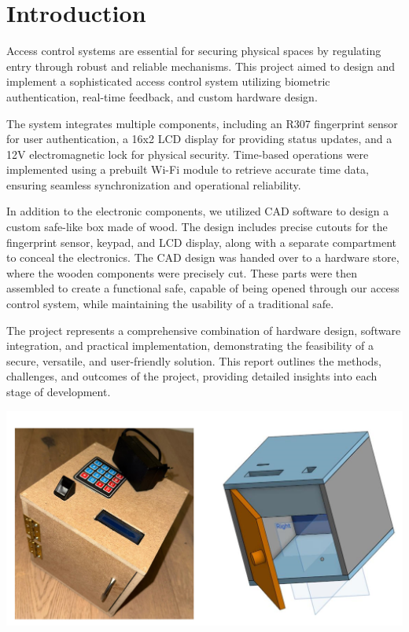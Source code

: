 \documentclass{article}
\begin{document}

\newpage 



\newpage
\section{Introduction}
Access control systems are essential for securing physical spaces by regulating entry through robust and reliable mechanisms. This project aimed to design and implement a sophisticated access control system utilizing biometric authentication, real-time feedback, and custom hardware design.

The system integrates multiple components, including an R307 fingerprint sensor for user authentication, a 16x2 LCD display for providing status updates, and a 12V electromagnetic lock for physical security. Time-based operations were implemented using a prebuilt Wi-Fi module to retrieve accurate time data, ensuring seamless synchronization and operational reliability.

In addition to the electronic components, we utilized CAD software to design a custom safe-like box made of wood. The design includes precise cutouts for the fingerprint sensor, keypad, and LCD display, along with a separate compartment to conceal the electronics. The CAD design was handed over to a hardware store, where the wooden components were precisely cut. These parts were then assembled to create a functional safe, capable of being opened through our access control system, while maintaining the usability of a traditional safe.

The project represents a comprehensive combination of hardware design, software integration, and practical implementation, demonstrating the feasibility of a secure, versatile, and user-friendly solution. This report outlines the methods, challenges, and outcomes of the project, providing detailed insights into each stage of development.



\begin{center}
    \includegraphics[width=\linewidth]{images/testpicture5.png}
    \captionsetup{hypcap=false}
    \captionsetup{hypcap=true} 
\end{center}
\end{document}
